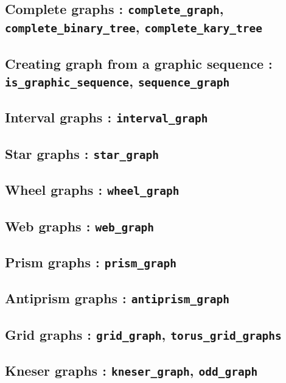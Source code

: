 \documentclass[a4paper,11pt]{article}
\begin{document}
\subsection{Complete graphs : {\tt complete\_graph}, {\tt complete\_binary\_tree}, {\tt complete\_kary\_tree}}

\subsection{Creating graph from a graphic sequence : {\tt is\_graphic\_sequence}, {\tt sequence\_graph}}

\subsection{Interval graphs : {\tt interval\_graph}}

\subsection{Star graphs : {\tt star\_graph}}

\subsection{Wheel graphs : {\tt wheel\_graph}}

\subsection{Web graphs : {\tt web\_graph}}

\subsection{Prism graphs : {\tt prism\_graph}}

\subsection{Antiprism graphs : {\tt antiprism\_graph}}

\subsection{Grid graphs : {\tt grid\_graph}, {\tt torus\_grid\_graphs}}

\subsection{Kneser graphs : {\tt kneser\_graph}, {\tt odd\_graph}}
\end{document}
